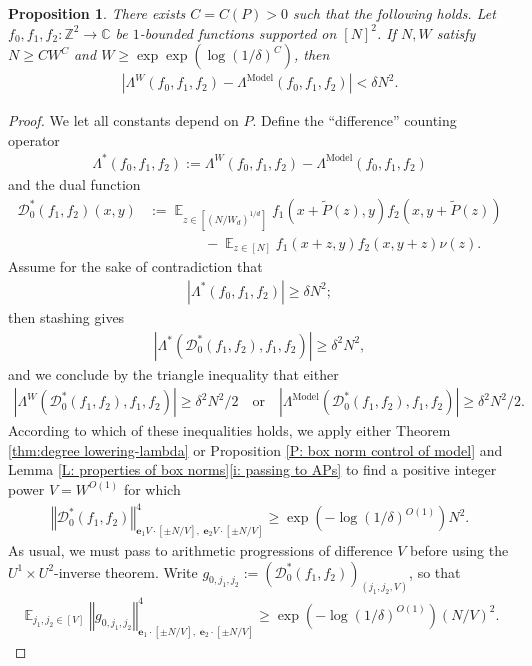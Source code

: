 \documentclass[11pt]{amsart}
\newtheorem{proposition}[lemma]{Proposition}
\theoremstyle{definition}
\DeclareMathOperator*{\E}{\mathbb{E}}
\newcommand{\C}{{\mathbb C}}
\newcommand{\Z}{{\mathbb Z}}
\newcommand{\CD}{{\mathcal D}}
\newcommand{\be}{{\mathbf{e}}}
\newcommand{\norm}[1]{\left\Vert #1\right\Vert}
\newcommand{\model}{{\mathrm{Model}}}
\begin{document}
\begin{proposition}\label{P: Lambda*}
    There exists $C = C(P)>0$ such that the following holds. Let $f_0, f_1, f_2:\Z^2\to\C$ be $1$-bounded functions supported on $[N]^2$. If $N, W$ satisfy $N\geq C W^{C}$ and $W\geq \exp\exp(\log(1/\delta)^{C})$, then
    \begin{align*}
        |\Lambda^W(f_0,f_1,f_2)-\Lambda^{\mathrm{Model}}(f_0,f_1,f_2)| <\delta N^2.
    \end{align*}
\end{proposition}


\begin{proof}
We let all constants depend on $P$.
Define the ``difference'' counting operator
\begin{align*}
    \Lambda^*(f_0, f_1, f_2) := \Lambda^W(f_0,f_1,f_2)-\Lambda^{\mathrm{Model}}(f_0,f_1,f_2)
\end{align*}
and the dual function
\begin{align*}
    \CD_0^*(f_1, f_2)(x,y) &:= \E_{z\in[(N/W_d)^{1/d}]}f_1(x + \widetilde P(z), y) f_2(x, y + \widetilde P(z))\\
    &\qquad\qquad- \E_{z\in[N]}f_1(x + z, y) f_2(x, y + z)\nu(z).
\end{align*}
Assume for the sake of contradiction that
\begin{align*}
    |\Lambda^*(f_0, f_1, f_2)|\geq \delta N^2;
\end{align*}
then stashing gives
\begin{align*}
    |\Lambda^*(\CD_0^*(f_1,f_2), f_1, f_2)|\geq \delta^2 N^2,
\end{align*}
and we conclude by the triangle inequality that either
\begin{align*}
    |\Lambda^W(\CD_0^*(f_1,f_2), f_1, f_2)|\geq \delta^2 N^2/2 \quad\textrm{or}\quad |\Lambda^\model(\CD_0^*(f_1,f_2), f_1, f_2)|\geq \delta^2 N^2/2.
\end{align*}
According to which of these inequalities holds, we apply either
Theorem \ref{thm:degree lowering-lambda} or Proposition \ref{P: box norm control of model} and Lemma \ref{L: properties of box norms}\eqref{i: passing to APs} to find a positive integer power $V = W^{O(1)}$ for which 
\begin{align*}
    \norm{\CD_{0}^*(f_1,f_2)}_{\be_1 V \cdot[\pm N/V],\; \be_2 V \cdot[\pm N/V]}^4 \geq \exp(-\log(1/\delta)^{O(1)})N^2.
\end{align*}
As usual, we must pass to arithmetic progressions of difference $V$ before using the $U^1 \times U^2$-inverse theorem. Write $g_{0, j_1, j_2}:= (\CD_0^*(f_1, f_2))_{(j_1, j_2, V)}$, so that
\begin{align*} 
    \E_{j_1, j_2\in[V]}\norm{g_{0, j_1, j_2}}_{\be_1 \cdot[\pm N/V],\; \be_2 \cdot[\pm N/V]}^4 \geq \exp(-\log(1/\delta)^{O(1)})(N/V)^2.
\end{align*}


\end{proof}
\end{document}
